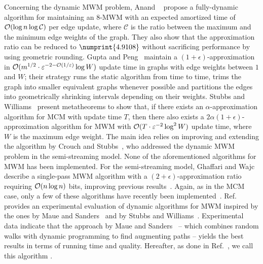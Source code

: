 Concerning the dynamic MWM problem, Anand \etal~\cite{DBLP:conf/fsttcs/AnandBGS12}
propose a fully-dynamic algorithm for maintaining an $8$-MWM with an expected
amortized time of $\mathcal{O}(\log n\log\mathcal{C})$ per edge update, where $\mathcal{C}$
is the ratio between the maximum and the minimum edge weights of the graph.
They also show that the approximation ratio can be reduced to
$\numprint{4.9108}$ without sacrificing performance by using geometric rounding.
Gupta and Peng~\cite{DBLP:conf/focs/GuptaP13} maintain a $(1 + \epsilon)$-approximation
in $\mathcal{O}(m^{1/2}\cdot\varepsilon^{-2-\mathcal{O}(1/\varepsilon)}\log W)$ update time in graphs with edge
weights between $1$ and $W$; their strategy runs the static algorithm from time to time,
trims the graph into smaller equivalent graphs whenever possible and partitions the
edges into geometrically shrinking intervals depending on their weights.
%
Stubbs and Williams~\cite{DBLP:conf/innovations/StubbsW17} present metatheorems to
show that, if there exists an $\alpha$-approximation algorithm for MCM with update time
$T$, then there also exists a $2\alpha(1 + \epsilon)$-approximation algorithm for MWM with
$\mathcal{O}(T\cdot\varepsilon^{-2}\log^2 W)$ update time, where $W$ is the maximum edge
weight. The main idea relies on improving and extending the algorithm by Crouch
and Stubbs~\cite{DBLP:conf/approx/CrouchS14}, who addressed the dynamic MWM problem
in the semi-streaming model. None of the aforementioned algorithms for MWM has been
implemented.
%
For the semi-streaming model, Ghaffari and Wajc~\cite{DBLP:conf/soda/GhaffariW19}
describe a single-pass MWM algorithm with a $(2 + \epsilon)$-approximation ratio
requiring $\mathcal{O}(n \log n)$ bits, improving previous
results~\cite{DBLP:conf/approx/CrouchS14,DBLP:journals/siamdm/EpsteinLMS11,
DBLP:journals/tcs/FeigenbaumKMSZ05,DBLP:conf/approx/McGregor05,DBLP:journals/talg/PazS19}.
Again, as in the MCM case, only a few of these algorithms have recently been
implemented~\cite{conf/acda/AngrimanMSU21}.
Ref.~\cite{conf/acda/AngrimanMSU21} provides an experimental
evaluation of dynamic algorithms for MWM inspired by the ones by Maue and
Sanders~\cite{DBLP:conf/wea/MaueS07} and by Stubbs and
Williams~\cite{DBLP:conf/innovations/StubbsW17}.
Experimental data indicate that the approach by Maue and
Sanders~\cite{DBLP:conf/wea/MaueS07} -- which combines random walks with
dynamic programming to find augmenting paths --
yields the best results in terms of running time and quality.
Hereafter, as done in Ref.~\cite{conf/acda/AngrimanMSU21},
we call this algorithm \dynmwmrandom.


